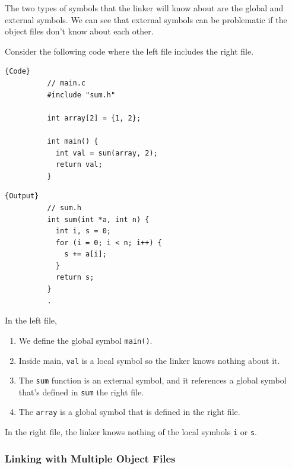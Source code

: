 \documentclass{article}
\begin{document}
      The two types of symbols that the linker will know about are the global and external symbols. We can see that external symbols can be problematic if the object files don't know about each other. 

      \begin{example}
        Consider the following code where the left file includes the right file. 

        \noindent\begin{minipage}{.5\textwidth}
        \begin{lstlisting}[]{Code}
          // main.c 
          #include "sum.h" 

          int array[2] = {1, 2}; 

          int main() {
            int val = sum(array, 2); 
            return val; 
          }
        \end{lstlisting}
        \end{minipage}
        \hfill
        \begin{minipage}{.49\textwidth}
        \begin{lstlisting}[]{Output}
          // sum.h 
          int sum(int *a, int n) {
            int i, s = 0; 
            for (i = 0; i < n; i++) {
              s += a[i]; 
            }
            return s; 
          }
          .
        \end{lstlisting}
        \end{minipage}
        In the left file, 
        \begin{enumerate}
          \item We define the global symbol \texttt{main()}. 
          \item Inside main, \texttt{val} is a local symbol so the linker knows nothing about it. 
          \item The \texttt{sum} function is an external symbol, and it references a global symbol that's defined in \texttt{sum} the right file. 
          \item The \texttt{array} is a global symbol that is defined in the right file. 
        \end{enumerate}
        In the right file, the linker knows nothing of the local symbols \texttt{i} or \texttt{s}. 
      \end{example}

    \subsubsection{Linking with Multiple Object Files}
\end{document}
